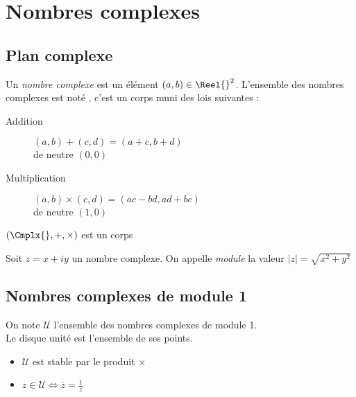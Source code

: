 \documentclass[11pt,a4paper,fleqn,pdftex]{report}
\begin{document}
\chapter{Nombres complexes} %
\label{cha:nombres_complexes}
\section{Plan complexe} %
\label{sec:plan_complexe}
\begin{dfn}
     Un \emph{nombre complexe} est un élément $(a,b) \in \Reel{}^2$. L'ensemble des nombres complexes est noté \Cmplx{}, c'est un corps muni des lois suivantes : 
     \begin{description}
         \item[Addition] $(a,b) + (c,d) = (a+c,b+d)$\hfill \\de neutre $(0,0)$
         \item[Multiplication] $(a,b) \times (c,d) = (ac - bd, ad + bc)$\hfill \\de neutre $(1,0)$
     \end{description}
\end{dfn}
\begin{theorem}
     $(\Cmplx{},+,\times{})$ est un corps 
\end{theorem}
\begin{dfn}[Module]
     Soit $z=x+iy$ un nombre complexe. On appelle \emph{module} la valeur $|z| = \sqrt{x^2 + y^2}$
\end{dfn}
\section{Nombres complexes de module 1} %
\label{sec:nombres_complexes_de_module_1}
\begin{dfn}
     On note $\mathcal{U}$ l'ensemble des nombres complexes de module 1.\\
     Le disque unité est l'ensemble de ses points.
\end{dfn}
\needspace{4cm}
\begin{prop}
    \begin{itemize}
        \item $\mathcal{U}$ est stable par le produit $\times$
        \item $z \in \mathcal{U} \Longleftrightarrow \overline{z} = \frac{1}{z}$
    \end{itemize}
\end{prop}
\end{document}
